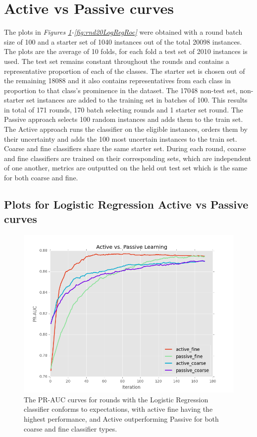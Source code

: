 \documentclass[ms]{nuthesis}
\begin{document}
\section{Active vs Passive curves}
\label{sect:actpass}
\par The plots in \textit{Figures \ref{fig:runActPassLogReg_pr}-\ref{fig:rnd20LogRegRoc}}
were obtained with a round batch size of 100
and a starter set of 1040 instances out of the total 20098 instances.
The plots are the average of 10 folds, for each fold a test set of 2010 instances
is used. The test set remains constant throughout the rounds and contains a representative proportion
 of each of the classes. The starter set is chosen out of the remaining 18088 and it also contains representatives
 from each class in proportion to that class's prominence in the dataset. The 17048 non-test set, non-starter set
  instances are added to the training set in batches of 100. This results in total of 171 rounds, 170 batch selecting
  rounds and 1 starter set round. The Passive approach selects 100 random instances
   and adds them to the train set. The Active approach runs the classifier on the eligible instances, orders them
   by their uncertainty and adds the 100 most uncertain instances to the train set. Coarse and fine classifiers
   share the same starter set. During each round, coarse and fine classifiers are trained on their corresponding
 sets, which are independent of one another, metrics are outputted on the held out test set which is the same for
 both coarse and fine.


\FloatBarrier
\subsection{Plots for Logistic Regression Active vs Passive curves}
\begin{figure}[!htb]
	\centering
    \includegraphics[width=1.0\columnwidth]{fig/runActPassLogReg_pr}
    \caption{The PR-AUC curves for rounds with the Logistic
Regression classifier conforms to expectations, with active fine having
the highest performance, and Active outperforming Passive for both coarse
and fine classifier types.}
\label{fig:runActPassLogReg_pr}
\end{figure}
\FloatBarrier
\end{document}
